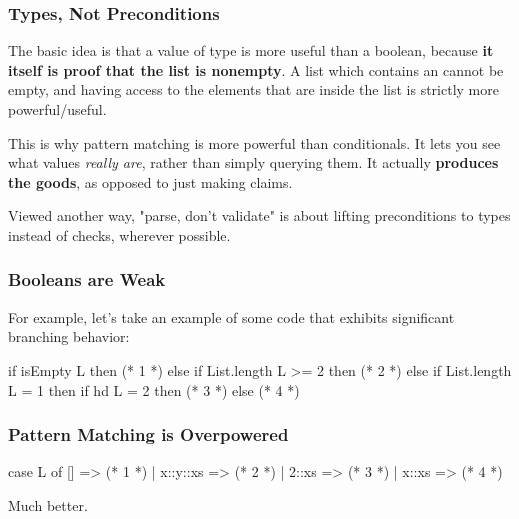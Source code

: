 \documentclass[aspectratio=169, handout]{beamer}
\begin{document}
\begin{frame}[fragile]
  \frametitle{Types, Not Preconditions}

  \tgs

  The basic idea is that a value of type  is more useful than
  a boolean, because \textbf{it itself is proof that the list
  is nonempty}. A list which contains an  cannot be empty, and having
  access to the elements that are inside the list is strictly more powerful/useful.

  \pause
  \vspace{\fill}

  This is why pattern matching is more powerful than conditionals. It lets you see
  what values \textit{really are}, rather than simply querying them. It actually
  \textbf{produces the goods}, as opposed to just making claims.

  \pause
  \vspace{\fill}

  Viewed another way, "parse, don't validate" is about lifting preconditions to
  types instead of checks, wherever possible.
\end{frame}


\begin{frame}[fragile]
  \frametitle{Booleans are Weak}

  For example, let's take an example of some code that exhibits
  significant branching behavior:

  \pause
  \vspace{\fill}

  \begin{codeblock}
    if isEmpty L then
      (* 1 *)
    else if List.length L >= 2 then
      (* 2 *)
    else if List.length L = 1 then
      if hd L = 2 then
        (* 3 *)
      else
        (* 4 *)
  \end{codeblock}

\end{frame}
\begin{frame}[fragile]
  \frametitle{Pattern Matching is Overpowered}

  \begin{codeblock}
    case L of
      [] => (* 1 *)
    | x::y::xs => (* 2 *)
    | 2::xs => (* 3 *)
    | x::xs => (* 4 *)
  \end{codeblock}

  \pause
  \vspace{\fill}

  Much better.
\end{frame}
\end{document}
